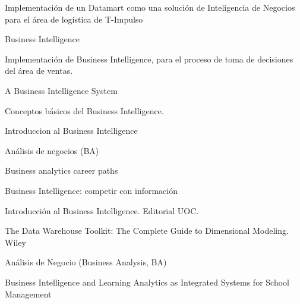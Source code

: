 \documentclass[twoside,twocolumn]{article}
\begin{document}
\begin{thebibliography}{99} 

\bibitem[NegashPaul  S., 2008]{}
\newblock Implementación de un Datamart como una solución de Inteligencia de Negocios para el área de logística de T-Impulso

\newblock Business Intelligence

\newblock Implementación de Business Intelligence, para el proceso de toma de decisiones del área de ventas.

\newblock A Business Intelligence System

Conceptos básicos del Business Intelligence.

\newblock Introduccion al Business Intelligence

\newblock Análisis de negocios (BA)

\newblock Business analytics career paths

\newblock Business Intelligence: competir con información

\bibitem[Curto J., 2010]{} 
\newblock Introducción al Business Intelligence. Editorial UOC.

\newblock  The Data Warehouse Toolkit: The Complete Guide to Dimensional Modeling. Wiley

\bibitem[Carolina A., 2017]{} 
\newblock  Análisis de Negocio (Business Analysis, BA)

\newblock  Business Intelligence and Learning Analytics as Integrated Systems for School Management
 
\end{thebibliography}


\end{document}
